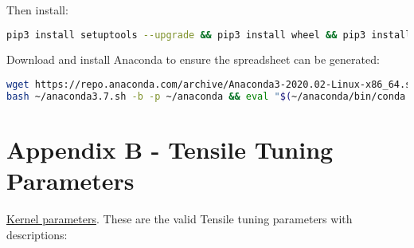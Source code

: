\documentclass[]{article}
\begin{document}
\noindent Then install:

\begin{lstlisting}[language=bash,breaklines=true]
pip3 install setuptools --upgrade && pip3 install wheel && pip3 install pyyaml msgpack
\end{lstlisting}

\noindent Download and install Anaconda to ensure the spreadsheet can be generated:

\begin{lstlisting}[language=bash,breaklines=true]
wget https://repo.anaconda.com/archive/Anaconda3-2020.02-Linux-x86_64.sh -O ~/anaconda3.7.sh && \
bash ~/anaconda3.7.sh -b -p ~/anaconda && eval "$(~/anaconda/bin/conda shell.bash hook)"
\end{lstlisting}

\section{Appendix B - Tensile Tuning Parameters}
\label{sec:appendixB}

\href{https://github.com/ROCmSoftwarePlatform/Tensile/wiki/Kernel-Parameters}{Kernel parameters}.
These are the valid Tensile tuning parameters with descriptions:
\end{document}
